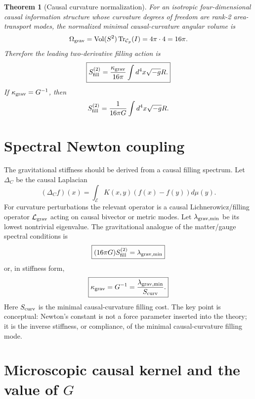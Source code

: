 \documentclass[11pt]{article}
\newtheorem{theorem}[definition]{Theorem}
\newcommand{\E}{\mathcal E}
\newcommand{\C}{\mathcal C}
\newcommand{\Vol}{\operatorname{Vol}}
\renewcommand{\Tr}{\operatorname{Tr}}
\begin{document}
\begin{theorem}[Causal curvature normalization]
For an isotropic four-dimensional causal information structure whose curvature degrees of freedom are rank-2 area-transport modes, the normalized minimal causal-curvature angular volume is
\begin{equation}
\Omega_{\rm grav}=\Vol(S^2)\Tr_{\C_p}(I)=4\pi\cdot4=16\pi.
\end{equation}
Therefore the leading two-derivative filling action is
\begin{equation}
\boxed{S_{\rm fill}^{(2)}=\frac{\kappa_{\rm grav}}{16\pi}\int d^4x\sqrt{-g}R.}
\end{equation}
If $\kappa_{\rm grav}=G^{-1}$, then
\begin{equation}
S_{\rm fill}^{(2)}=\frac{1}{16\pi G}\int d^4x\sqrt{-g}R.
\end{equation}
\end{theorem}


\section{Spectral Newton coupling}

The gravitational stiffness should be derived from a causal filling spectrum. Let $\Delta_C$ be the causal Laplacian
\begin{equation}
(\Delta_Cf)(x)=\int_\E K(x,y)(f(x)-f(y))d\mu(y).
\end{equation}
For curvature perturbations the relevant operator is a causal Lichnerowicz/filling operator $\mathcal L_{\rm grav}$ acting on causal bivector or metric modes. Let $\lambda_{\rm grav,min}$ be its lowest nontrivial eigenvalue. The gravitational analogue of the matter/gauge spectral conditions is
\begin{equation}
\boxed{(16\pi G)S_{\rm fill}^{(2)}=\lambda_{\rm grav,min}}
\end{equation}
or, in stiffness form,
\begin{equation}
\boxed{\kappa_{\rm grav}=G^{-1}=\frac{\lambda_{\rm grav,min}}{S_{\rm curv}}.}
\end{equation}
Here $S_{\rm curv}$ is the minimal causal-curvature filling cost. The key point is conceptual: Newton's constant is not a force parameter inserted into the theory; it is the inverse stiffness, or compliance, of the minimal causal-curvature filling mode.

\section{Microscopic causal kernel and the value of $G$}
\end{document}

